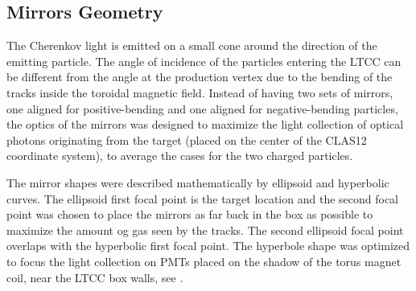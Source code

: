 \subsection{Mirrors Geometry}

The Cherenkov light is emitted on a small cone around the direction of the emitting particle. The angle of
incidence of the particles entering the LTCC can be different from the angle at the production vertex due to the bending of the tracks
inside the toroidal magnetic field. Instead of having two sets of mirrors, one aligned for positive-bending and one aligned for negative-bending particles,
the optics of the mirrors was designed to maximize the light collection of optical photons originating from the target (placed on the center of the CLAS12 coordinate system),
to average the cases for the two charged particles.

The mirror shapes were described mathematically by ellipsoid and hyperbolic curves.
The ellipsoid first focal point is the target location and the second focal point was chosen
to place the mirrors as far back in the box as possible to maximize the amount og gas seen by the tracks.
The second ellipsoid focal point overlaps with the hyperbolic first focal point. The hyperbole shape was optimized to focus the light
collection on PMTs placed on the shadow of the torus magnet coil, near the LTCC box walls, see .


